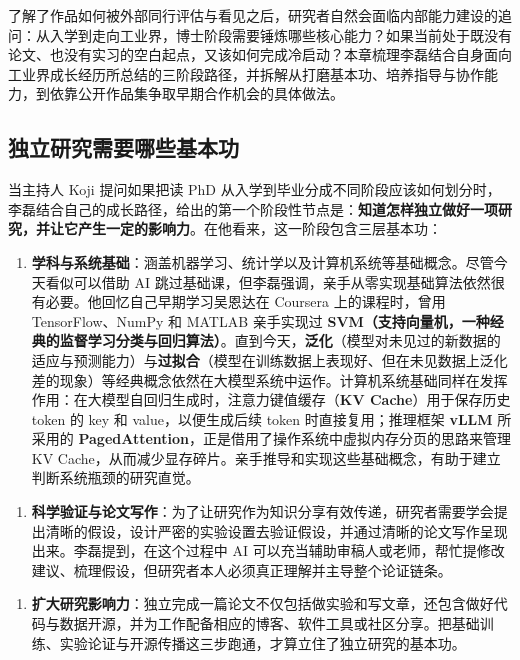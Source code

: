 \documentclass[UTF8,a4paper,11pt,fontset=fandol]{ctexart}
\begin{document}
了解了作品如何被外部同行评估与看见之后，研究者自然会面临内部能力建设的追问：从入学到走向工业界，博士阶段需要锤炼哪些核心能力？如果当前处于既没有论文、也没有实习的空白起点，又该如何完成冷启动？本章梳理李磊结合自身面向工业界成长经历所总结的三阶段路径，并拆解从打磨基本功、培养指导与协作能力，到依靠公开作品集争取早期合作机会的具体做法。
\subsection{独立研究需要哪些基本功}
当主持人 Koji 提问如果把读 PhD 从入学到毕业分成不同阶段应该如何划分时，李磊结合自己的成长路径，给出的第一个阶段性节点是：\textbf{知道怎样独立做好一项研究，并让它产生一定的影响力}。在他看来，这一阶段包含三层基本功：

\begin{enumerate}
\item \textbf{学科与系统基础}：涵盖机器学习、统计学以及计算机系统等基础概念。尽管今天看似可以借助 AI 跳过基础课，但李磊强调，亲手从零实现基础算法依然很有必要。他回忆自己早期学习吴恩达在 Coursera 上的课程时，曾用 TensorFlow、NumPy 和 MATLAB 亲手实现过 \textbf{SVM（支持向量机，一种经典的监督学习分类与回归算法）}。直到今天，\textbf{泛化}（模型对未见过的新数据的适应与预测能力）与\textbf{过拟合}（模型在训练数据上表现好、但在未见数据上泛化差的现象）等经典概念依然在大模型系统中运作。计算机系统基础同样在发挥作用：在大模型自回归生成时，注意力键值缓存（\textbf{KV Cache}）用于保存历史 token 的 key 和 value，以便生成后续 token 时直接复用；推理框架 \textbf{vLLM} 所采用的 \textbf{PagedAttention}，正是借用了操作系统中虚拟内存分页的思路来管理 KV Cache，从而减少显存碎片。亲手推导和实现这些基础概念，有助于建立判断系统瓶颈的研究直觉。
\end{enumerate}

\begin{enumerate}
\item \textbf{科学验证与论文写作}：为了让研究作为知识分享有效传递，研究者需要学会提出清晰的假设，设计严密的实验设置去验证假设，并通过清晰的论文写作呈现出来。李磊提到，在这个过程中 AI 可以充当辅助审稿人或老师，帮忙提修改建议、梳理假设，但研究者本人必须真正理解并主导整个论证链条。
\end{enumerate}

\begin{enumerate}
\item \textbf{扩大研究影响力}：独立完成一篇论文不仅包括做实验和写文章，还包含做好代码与数据开源，并为工作配备相应的博客、软件工具或社区分享。把基础训练、实验论证与开源传播这三步跑通，才算立住了独立研究的基本功。
\end{enumerate}
\end{document}
